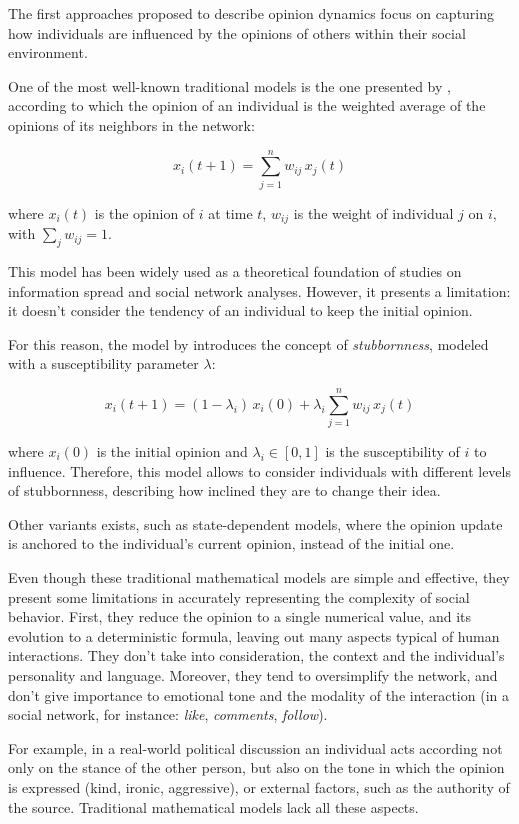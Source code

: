 \medskip
The first approaches proposed to describe opinion dynamics focus on capturing how individuals are influenced by the opinions of others within their social environment.

One of the most well-known traditional models is the one presented by \citet{Degroot1974}, according to which the opinion of an individual is the weighted average of the opinions of its neighbors in the network:

\[
x_i(t+1) = \sum_{j=1}^n w_{ij} \, x_j(t)
\]

where $x_i(t)$ is the opinion of $i$ at time $t$, $w_{ij}$ is the weight of individual $j$ on $i$, with $\sum_{j} w_{ij}=1$.

This model has been widely used as a theoretical foundation of studies on information spread and social network analyses. However, it presents a limitation: it doesn’t consider the tendency of an individual to keep the initial opinion.

For this reason, the model by \citet{friedkin_1990} introduces the concept of \textit{stubbornness}, modeled with a susceptibility parameter $\lambda$:

\[
x_i(t+1) = (1 - \lambda_i) \, x_i(0) + \lambda_i \sum_{j=1}^n w_{ij} \, x_j(t)
\]

where $x_i(0)$ is the initial opinion and $\lambda_i \in [0, 1]$ is the susceptibility of $i$ to influence.
Therefore, this model allows to consider individuals with different levels of stubbornness, describing how inclined they are to change their idea.

Other variants exists, such as state-dependent models, where the opinion update is anchored to the individual's current opinion, instead of the initial one.


\medskip
Even though these traditional mathematical models are simple and effective, they present some limitations in accurately representing the complexity of social behavior.
First, they reduce the opinion to a single numerical value, and its evolution to a deterministic formula, leaving out many aspects typical of human interactions.
They don't take into consideration, the context and the individual's personality and language.
Moreover, they tend to oversimplify the network, and don't give importance to emotional tone and the modality of the interaction (in a social network, for instance: \textit{like}, \textit{comments}, \textit{follow}).

For example, in a real-world political discussion an individual acts according not only on the stance of the other person, but also on the tone in which the opinion is expressed (kind, ironic, aggressive), or external factors, such as the authority of the source.
Traditional mathematical models lack all these aspects.


